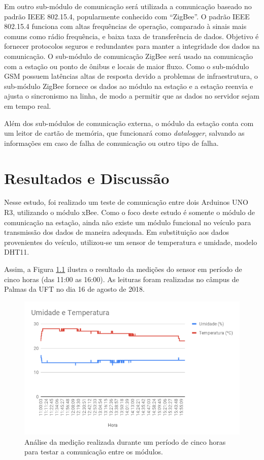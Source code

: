 \documentclass[12pt]{uftpibicsic2018}
\begin{document}
Em outro sub-módulo de comunicação será utilizada a comunicação baseado no padrão IEEE 802.15.4, popularmente conhecido com ``ZigBee''. O padrão IEEE 802.15.4 funciona com altas frequências de operação, comparado à sinais mais comuns como rádio frequência, e baixa taxa de transferência de dados. Objetivo é fornecer protocolos seguros e redundantes para manter a integridade dos dados na comunicação. O sub-módulo de comunicação ZigBee será usado na comunicação com a estação ou ponto de ônibus e locais de maior fluxo. Como o sub-módulo GSM possuem latências altas de resposta devido a problemas de infraestrutura, o sub-módulo ZigBee fornece os dados ao módulo na estação e a estação reenvia e ajusta o sincronismo na linha, de modo a permitir que as dados no servidor sejam em tempo real.

Além dos sub-módulos de comunicação externa, o módulo da estação conta com um leitor de cartão de memória, que funcionará como \textit{datalogger}, salvando as informações em caso de falha de comunicação ou outro tipo de falha.

\chapter{Resultados e Discussão}\vskip -12pt

Nesse estudo, foi realizado um teste de comunicação entre dois Arduinos UNO R3, utilizando o módulo xBee. Como o foco deste estudo é somente o módulo de comunicação na estação, ainda não existe um módulo funcional no veículo para transmissão dos dados de maneira adequada. Em substituição aos dados provenientes do veículo, utilizou-se um sensor de temperatura e umidade, modelo DHT11.

Assim, a Figura \ref{fig:umtemp} ilustra o resultado da medições do sensor em período de cinco horas (das 11:00 as 16:00). As leituras foram realizadas no câmpus de Palmas da UFT no dia 16 de agosto de 2018.

\begin{figure}[!h]
\centering
\includegraphics[width=12cm]{Umidade_e_Temperatura_.png}
\caption{Análise da medição realizada durante um período de cinco horas para testar a comunicação entre os módulos.}
\label{fig:umtemp}
\end{figure}
\end{document}
